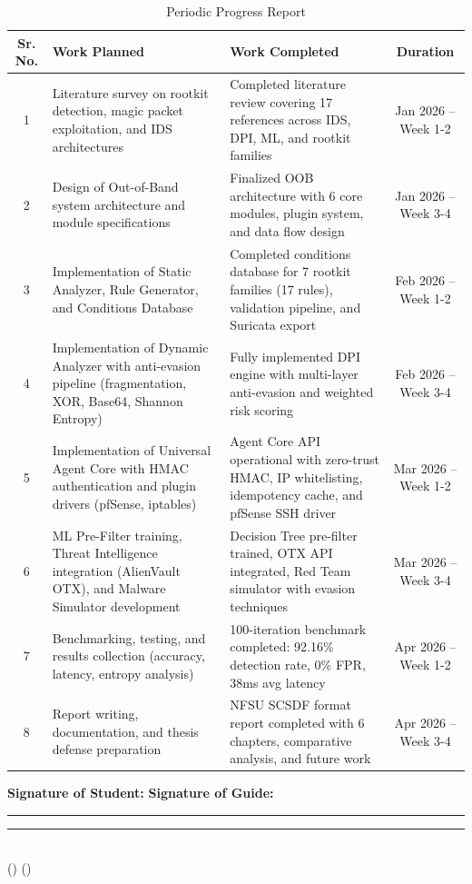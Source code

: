 \begin{table}[h]
\centering
\caption{Periodic Progress Report}
\label{tab:progress_report}
\renewcommand{\arraystretch}{1.4}
\begin{tabular}{|c|p{5cm}|p{4cm}|c|}
\hline
\textbf{Sr. No.} & \textbf{Work Planned} & \textbf{Work Completed} & \textbf{Duration} \\
\hline
1 & Literature survey on rootkit detection, magic packet exploitation, and IDS architectures & Completed literature review covering 17 references across IDS, DPI, ML, and rootkit families & Jan 2026 -- Week 1-2 \\
\hline
2 & Design of Out-of-Band system architecture and module specifications & Finalized OOB architecture with 6 core modules, plugin system, and data flow design & Jan 2026 -- Week 3-4 \\
\hline
3 & Implementation of Static Analyzer, Rule Generator, and Conditions Database & Completed conditions database for 7 rootkit families (17 rules), validation pipeline, and Suricata export & Feb 2026 -- Week 1-2 \\
\hline
4 & Implementation of Dynamic Analyzer with anti-evasion pipeline (fragmentation, XOR, Base64, Shannon Entropy) & Fully implemented DPI engine with multi-layer anti-evasion and weighted risk scoring & Feb 2026 -- Week 3-4 \\
\hline
5 & Implementation of Universal Agent Core with HMAC authentication and plugin drivers (pfSense, iptables) & Agent Core API operational with zero-trust HMAC, IP whitelisting, idempotency cache, and pfSense SSH driver & Mar 2026 -- Week 1-2 \\
\hline
6 & ML Pre-Filter training, Threat Intelligence integration (AlienVault OTX), and Malware Simulator development & Decision Tree pre-filter trained, OTX API integrated, Red Team simulator with evasion techniques & Mar 2026 -- Week 3-4 \\
\hline
7 & Benchmarking, testing, and results collection (accuracy, latency, entropy analysis) & 100-iteration benchmark completed: 92.16\% detection rate, 0\% FPR, 38ms avg latency & Apr 2026 -- Week 1-2 \\
\hline
8 & Report writing, documentation, and thesis defense preparation & NFSU SCSDF format report completed with 6 chapters, comparative analysis, and future work & Apr 2026 -- Week 3-4 \\
\hline
\end{tabular}
\end{table}

\vspace{1cm}

\noindent\textbf{Signature of Student:} \hspace{4cm} \textbf{Signature of Guide:} \\

\vspace{1.5cm}

\noindent\rule{5cm}{0.4pt} \hfill \rule{5cm}{0.4pt} \\
\noindent (\StudentName) \hfill (\SupervisorName) \\
